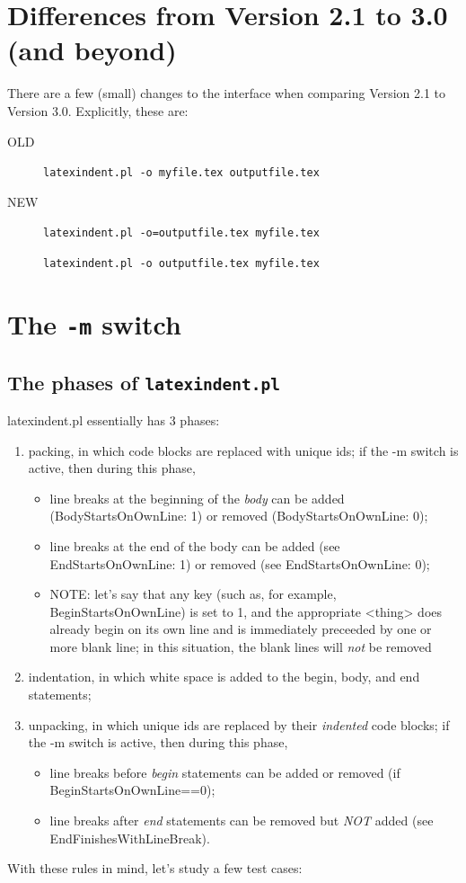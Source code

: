 \documentclass[11pt]{article}
\begin{document}
\section{Differences from Version 2.1 to 3.0 (and beyond)}
There are a few (small) changes to the interface when comparing Version 2.1 to Version 3.0. 
Explicitly, these are:
\begin{description}
  \item[OLD] \lstinline!latexindent.pl -o myfile.tex outputfile.tex!
    \item[NEW] \lstinline!latexindent.pl -o=outputfile.tex myfile.tex!

      \lstinline!latexindent.pl -o outputfile.tex myfile.tex!
\end{description}

\section{The \lstinline!-m! switch}
\subsection{The phases of \lstinline!latexindent.pl!}
latexindent.pl essentially has 3 phases:
\begin{enumerate}
  \item packing, in which code blocks are replaced with unique ids; if the -m switch is active, then during this phase,
    \begin{itemize}
      \item line breaks at the beginning of the \emph{body} can be added (BodyStartsOnOwnLine: 1) or removed (BodyStartsOnOwnLine: 0);
      \item line breaks at the end of the body can be added (see EndStartsOnOwnLine: 1) or removed (see EndStartsOnOwnLine: 0);
      \item NOTE: let's say that any key (such as, for example, BeginStartsOnOwnLine) is set to 1, and the 
        appropriate <thing> does already begin on its own line and is immediately preceeded by one or more blank line; in this situation, 
        the blank lines will \emph{not} be removed
    \end{itemize}
  \item indentation, in which white space is added to the begin, body, and end statements;
  \item unpacking, in which unique ids are replaced by their \emph{indented} code blocks; if the -m switch is active, then during this phase,
    \begin{itemize}
      \item line breaks before \emph{begin} statements can be added or removed (if BeginStartsOnOwnLine==0);
      \item line breaks after \emph{end} statements can be removed but \emph{NOT} added (see EndFinishesWithLineBreak).
    \end{itemize}
\end{enumerate}
With these rules in mind, let's study a few test cases:
\end{document}
